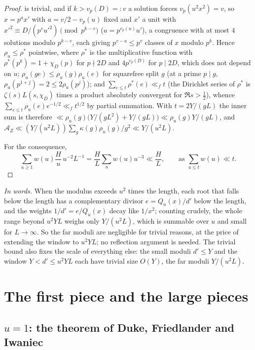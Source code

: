 \documentclass[11pt,a4paper]{article}
\theoremstyle{remark}\newtheorem{remark}[theorem]{Remark}
\begin{document}
\begin{proof}
is trivial, and if $k>v_p(D)=:v$ a solution forces $v_p(u^2x^2)=v$, so $x=p^ax'$ with $a=v/2-v_p(u)$ fixed and $x'$ a
unit with $x'^2\equiv D/(p^vu'^2)\pmod{p^{k-v}}$ ($u=p^{v_p(u)}u'$), a congruence with at most $4$ solutions modulo
$p^{k-v}$, each giving $p^{v-a}\le p^v$ classes of $x$ modulo $p^k$. Hence $\rho_u\le\rho^\ast$ pointwise, where $\rho^\ast$
is the multiplicative function with $\rho^\ast(p^k)=1+\chi_D(p)$ for $p\nmid2D$ and $4p^{v_p(D)}$ for $p\mid2D$, which does
not depend on $u$; $\rho_u(ge)\le\rho_u(g)\rho_u(e)$ for squarefree split $g$ (at a prime $p\mid g$, $\rho_u(p^{1+j})=2\le2\rho_u(p^j)$);
and $\sum_{e\le t}\rho^\ast(e)\ll_ft$ (the Dirichlet series of $\rho^\ast$ is $\zeta(s)L(s,\chi_D)$ times a product absolutely
convergent for $\Re s>\tfrac12$), whence $\sum_{e\le t}\rho_u(e)e^{-1/2}\ll_ft^{1/2}$ by partial summation. With $t=2Y/(gL)$ the inner sum is therefore
$\ll\rho_u(g)\bigl(Y/(gL^2)+Y/(gL)\bigr)\ll\rho_u(g)Y/(gL)$, and $\mathcal A_Z\ll(Y/(u^2L))\sum_g\kappa(g)\rho_u(g)/g^2\ll Y/(u^2L)$.

For the consequence,
\[
\sum_{u\ge1}w(u)\frac Hu\,u^{-2}L^{-1}=\frac HL\sum_uw(u)u^{-3}\ll\frac HL,\qquad\text{as }\sum_{u\le t}w(u)\ll t.
\]
\end{proof}

\emph{In words.} When the modulus exceeds $u^2$ times the length, each root that falls below the length has
a complementary divisor $e=Q_u(x)/d'$ below the length, and the weights $1/d'=e/Q_u(x)$ decay like $1/x^2$;
counting crudely, the whole range beyond $u^2YL$ weighs only $Y/(u^2L)$, which is summable over $u$ and small
for $L\to\infty$. So the far moduli are negligible for trivial reasons, at the price of extending the window to
$u^2YL$; no reflection argument is needed. The trivial bound also fixes the scale of everything else: the small
moduli $d'\le Y$ and the window $Y<d'\le u^2YL$ each have trivial size $O(Y)$, the far moduli $Y/(u^2L)$.

\section{The first piece and the large pieces}\label{sec:unconditional}

\subsection{$u=1$: the theorem of Duke, Friedlander and Iwaniec}
\end{document}
